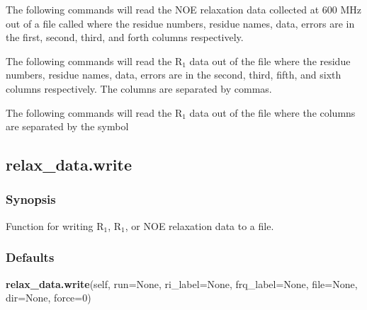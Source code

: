 The following commands will read the NOE relaxation data collected at 600 MHz out of a file
called 
 where the residue numbers, residue names, data, errors are in the
first, second, third, and forth columns respectively.





The following commands will read the R$_1$ data out of the file 
 where the residue
numbers, residue names, data, errors are in the second, third, fifth, and sixth columns
respectively.  The columns are separated by commas.





The following commands will read the R$_1$ data out of the file 
 where the columns are
separated by the symbol 




\newpage

\subsection{relax\_data.write}


\subsubsection{Synopsis}

Function for writing R$_1$, R$_1$, or NOE relaxation data to a file.

\subsubsection{Defaults}

\textsf{\textbf{relax\_data.write}(self, run=None, ri\_label=None, frq\_label=None, file=None, dir=None, force=0)}


